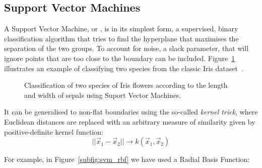 \subsection{Support Vector Machines}
A Support Vector Machine, or \SVM, is in its simplest form, a supervised, binary classification algorithm that tries to find the hyperplane that maximises the separation of the two groups.
To account for noise, a slack parameter, that will ignore points that are too close to the boundary can be included.
Figure~\ref{fig:svm} illustrates an example of classifying two species from the classic Iris dataset~\citep{iris_dataset}.


\begin{figure}
\centering
{}%
\hfill
{}%
\caption{Classification of two species of Iris flowers according to the length and width of sepals using Suport Vector Machines.}\label{fig:svm}
\end{figure}

It can be generalised to non-flat boundaries using the so-called \emph{kernel trick},
where Euclidean distances  
are replaced with an arbitrary measure of similarity given by positive-definite kernel function:
\[||\vec{x}_1 - \vec{x}_2|| \rightarrow k(\vec{x}_1, \vec{x}_2)\]

For example, in Figure~\ref{subfig:svm_rbf} we have used a Radial Basis Function:

